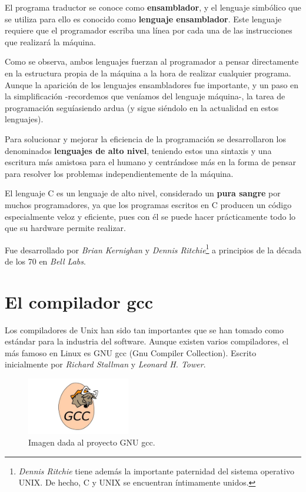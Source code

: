 \documentclass[a4paper, 11pt, titlepage]{article}
\begin{document}
    El programa traductor se conoce como \textbf{ensamblador}, y el lenguaje simbólico
    que se utiliza para ello es conocido como \textbf{lenguaje ensamblador}. Este 
    lenguaje requiere que el programador escriba una línea por cada una de las 
    instrucciones que realizará la máquina.

    Como se observa, ambos lenguajes fuerzan al programador a pensar directamente en 
    la estructura propia de  la máquina a la hora de realizar cualquier programa.
    Aunque la aparición de los lenguajes ensambladores fue importante, y un paso en 
    la simplificación -recordemos que veníamos del lenguaje máquina-, la tarea de 
    programación seguíasiendo ardua (y sigue siéndolo en la actualidad en estos 
    lenguajes).

    Para solucionar y mejorar la eficiencia de la programación se desarrollaron los 
    denominados \textbf{lenguajes de alto nivel}, teniendo estos una sintaxis y una
    escritura más amistosa para el humano y centrándose más en la forma de pensar 
    para resolver los problemas independientemente de la máquina.

    El lenguaje C es un lenguaje de alto nivel, considerado un \textbf{pura sangre}
    por muchos programadores, ya que los programas escritos en C producen un código 
    especialmente veloz y eficiente, pues con él se puede hacer prácticamente todo 
    lo que su hardware permite realizar.

    Fue desarrollado por \textit{Brian Kernighan} y \textit{Dennis Ritchie}\footnote{
        \textit{Dennis Ritchie} tiene además la importante paternidad del sistema 
        operativo UNIX. De hecho, C y UNIX se encuentran íntimamente unidos.
    } a principios
    de la década de los 70 en \textit{Bell Labs}.

\section{El compilador gcc}\label{compilador}

    Los compiladores de Unix han sido tan importantes que se han tomado como estándar para la industria 
    del software. Aunque existen varios compiladores, el más famoso en Linux es GNU gcc (Gnu Compiler 
    Collection). Escrito inicialmente por \textit{Richard Stallman} y \textit{Leonard H. Tower}.

    \begin{figure}[htp]
        \centering
        \includegraphics[width=0.4\textwidth]{resources/gnu-gcc.png}
        \caption{Imagen dada al proyecto GNU gcc.}
        \label{gcclogo}
    \end{figure}
\end{document}
